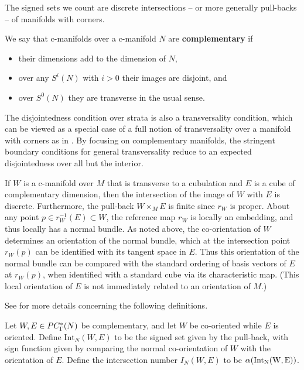 The signed sets we count are discrete intersections -- or more generally pull-backs -- of manifolds with corners.

\begin{comment}
For the following definitions we will consider manifolds with corners mapping to manifolds with corners.
HEREHERE
\end{comment}

\begin{definition}\label{D:complementary}
	We say that c-manifolds over a c-manifold $N$ are \textbf{complementary} if
	\begin{itemize}
		\item their dimensions add to the dimension of $N$,
		\item over any $S^i(N)$ with $i>0$ their images are disjoint, and
		\item over $S^0(N)$ they are transverse in the usual sense.
	\end{itemize}
\end{definition}

The disjointedness condition over strata is also a transversality condition, which can be viewed as a special case of a full notion of transversality over a manifold with corners as in \cite{Joy12}.
By focusing on complementary manifolds, the stringent boundary conditions for general transversality reduce to an expected disjointedness over all but the interior.

If $W$ is a c-manifold over $M$ that is transverse to a cubulation and $E$ is a cube of complementary dimension, then the intersection of the image of $W$ with $E$ is discrete.
Furthermore, the pull-back $W \times_M E$ is finite since $r_W$ is proper.
About any point $p \in r_W^{-1}(E) \subset W$, the reference map $r_W$ is locally an embedding, and thus locally has a normal bundle.
As noted above, the co-orientation of $W$ determines an orientation of the normal bundle, which at the intersection point $r_W(p)$ can be identified with its tangent space in $E$.
Thus this orientation of the normal bundle can be compared with the standard ordering of basis vectors of $E$ at $r_W(p)$, when identified with a standard cube via its characteristic map.
(This local orientation of $E$ is not immediately related to an orientation of $M$.)

See \cite[Section 6.5]{medina2022foundations} for more details concerning the following definitions.

\begin{definition}\label{D:intersection number}
	Let $W, E \in PC_\Gamma^*({N})$ be complementary, and let $W$ be co-oriented while $E$ is oriented. Define $\mathrm{Int}_N(W, E)$ to be the signed set given
	by the pull-back, with sign function given by comparing the normal co-orientation of $W$ with the orientation of $E$.
	Define the intersection number $I_N(W,E)$ to be $\alpha(\rm{Int}_N(W, E))$.
\end{definition}

